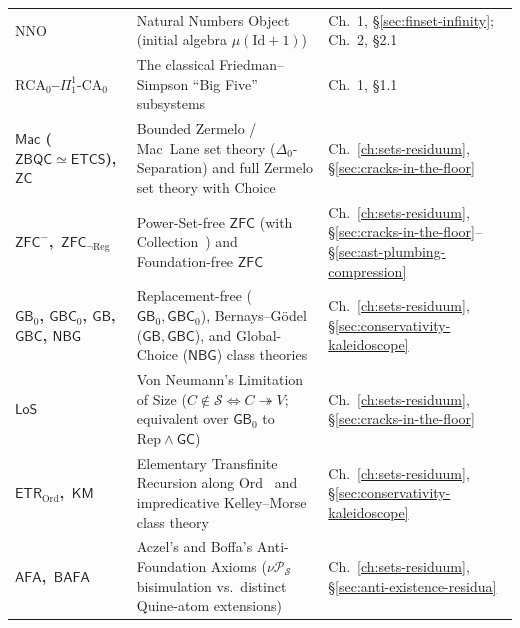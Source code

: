 \documentclass[10pt,twoside,openright]{book}
\theoremstyle{crmplain}
\theoremstyle{crmdef}
\theoremstyle{crmremark}
\begin{document}
{\begin{xltabular}{\textwidth}{@{}>{\bfseries}P{0.24\textwidth}YP{0.21\textwidth}@{}}
$\mathrm{NNO}$ & Natural Numbers Object (initial algebra $\mu(\mathrm{Id}+1)$) & Ch.~1, \S\ref{sec:finset-infinity}; Ch.~2, \S2.1 \\
$\mathrm{RCA}_0$--$\Pi^1_1\text{-}\mathrm{CA}_0$ & The classical Friedman--Simpson ``Big Five'' subsystems & Ch.~1, \S1.1 \\
$\mathsf{Mac}$ ($\mathsf{ZBQC} \simeq \mathsf{ETCS}$), $\mathsf{ZC}$ & Bounded Zermelo / Mac~Lane set theory ($\Delta_0$-Separation) and full Zermelo set theory with Choice & Ch.~\ref{ch:sets-residuum}, \S\ref{sec:cracks-in-the-floor} \\
$\mathsf{ZFC}^-$,\, $\mathsf{ZFC}_{\neg\mathrm{Reg}}$ & Power-Set-free $\mathsf{ZFC}$ (with Collection~\cite{GitmanHamkinsJohnstone16}) and Foundation-free $\mathsf{ZFC}$~\cite{Felgner76} & Ch.~\ref{ch:sets-residuum}, \S\ref{sec:cracks-in-the-floor}--\S\ref{sec:ast-plumbing-compression} \\
$\mathsf{GB}_0$, $\mathsf{GBC}_0$, $\mathsf{GB}$, $\mathsf{GBC}$, $\mathsf{NBG}$ & Replacement-free ($\mathsf{GB}_0, \mathsf{GBC}_0$), Bernays--G\"odel ($\mathsf{GB}, \mathsf{GBC}$), and Global-Choice ($\mathsf{NBG}$) class theories & Ch.~\ref{ch:sets-residuum}, \S\ref{sec:conservativity-kaleidoscope} \\
$\mathsf{LoS}$ & Von Neumann's Limitation of Size ($C \notin \mathcal{S} \iff C \twoheadrightarrow V$; equivalent over $\mathsf{GB}_0$ to $\mathrm{Rep} \wedge \mathsf{GC}$) & Ch.~\ref{ch:sets-residuum}, \S\ref{sec:cracks-in-the-floor} \\
$\mathsf{ETR}_{\mathrm{Ord}}$,\, $\mathsf{KM}$ & Elementary Transfinite Recursion along $\mathrm{Ord}$~\cite{Gitman20} and impredicative Kelley--Morse class theory & Ch.~\ref{ch:sets-residuum}, \S\ref{sec:conservativity-kaleidoscope} \\
$\mathsf{AFA}$,\, $\mathsf{BAFA}$ & Aczel's and Boffa's Anti-Foundation Axioms ($\nu\mathcal{P}_{\mathcal{S}}$ bisimulation vs.\ distinct Quine-atom extensions) & Ch.~\ref{ch:sets-residuum}, \S\ref{sec:anti-existence-residua} \\
\end{xltabular}\par}

\vspace{1.0em}
\end{document}
